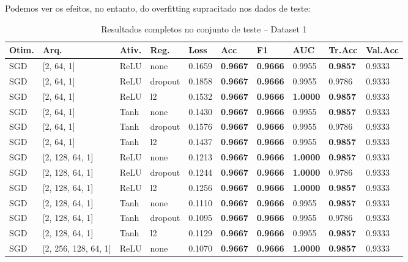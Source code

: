 \documentclass[12pt,a4paper]{article}
\begin{document}
Podemos ver os efeitos, no entanto, do overfitting supracitado nos dados de teste:

\begin{table}[h]
\centering
\caption{Resultados completos no conjunto de teste -- Dataset 1}
\label{tab:full_results_dataset_1}
\scriptsize
\setlength{\tabcolsep}{4pt}
\begin{tabular}{llllllllll}
\toprule
\textbf{Otim.} & \textbf{Arq.} & \textbf{Ativ.} & \textbf{Reg.} & \textbf{Loss} & \textbf{Acc} & \textbf{F1} & \textbf{AUC} & \textbf{Tr.Acc} & \textbf{Val.Acc} \\
\midrule
SGD & [2, 64, 1] & ReLU & none & 0.1659 & \textbf{0.9667} & \textbf{0.9666} & 0.9955 & \textbf{0.9857} & 0.9333 \\
SGD & [2, 64, 1] & ReLU & dropout & 0.1858 & \textbf{0.9667} & \textbf{0.9666} & 0.9955 & 0.9786 & 0.9333 \\
SGD & [2, 64, 1] & ReLU & l2 & 0.1532 & \textbf{0.9667} & \textbf{0.9666} & \textbf{1.0000} & \textbf{0.9857} & 0.9333 \\
SGD & [2, 64, 1] & Tanh & none & 0.1430 & \textbf{0.9667} & \textbf{0.9666} & 0.9955 & \textbf{0.9857} & 0.9333 \\
SGD & [2, 64, 1] & Tanh & dropout & 0.1576 & \textbf{0.9667} & \textbf{0.9666} & 0.9955 & 0.9786 & 0.9333 \\
SGD & [2, 64, 1] & Tanh & l2 & 0.1437 & \textbf{0.9667} & \textbf{0.9666} & 0.9955 & \textbf{0.9857} & 0.9333 \\
SGD & [2, 128, 64, 1] & ReLU & none & 0.1213 & \textbf{0.9667} & \textbf{0.9666} & \textbf{1.0000} & \textbf{0.9857} & 0.9333 \\
SGD & [2, 128, 64, 1] & ReLU & dropout & 0.1244 & \textbf{0.9667} & \textbf{0.9666} & \textbf{1.0000} & 0.9786 & 0.9333 \\
SGD & [2, 128, 64, 1] & ReLU & l2 & 0.1256 & \textbf{0.9667} & \textbf{0.9666} & \textbf{1.0000} & \textbf{0.9857} & 0.9333 \\
SGD & [2, 128, 64, 1] & Tanh & none & 0.1110 & \textbf{0.9667} & \textbf{0.9666} & 0.9955 & \textbf{0.9857} & 0.9333 \\
SGD & [2, 128, 64, 1] & Tanh & dropout & 0.1095 & \textbf{0.9667} & \textbf{0.9666} & 0.9955 & 0.9786 & 0.9333 \\
SGD & [2, 128, 64, 1] & Tanh & l2 & 0.1129 & \textbf{0.9667} & \textbf{0.9666} & 0.9955 & \textbf{0.9857} & 0.9333 \\
SGD & [2, 256, 128, 64, 1] & ReLU & none & 0.1070 & \textbf{0.9667} & \textbf{0.9666} & \textbf{1.0000} & \textbf{0.9857} & 0.9333 \\

\end{tabular}
\end{table}
\end{document}

